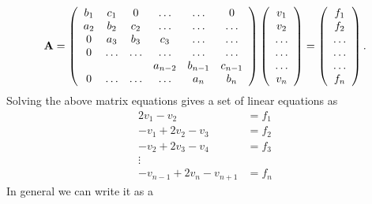 \begin{align}
	\mbox{\textbf{A}} = \left(\begin{array}{cccccc}
                           b_1& c_1 & 0 &\dots   & \dots & 0 \\
                           a_2 & b_2 & c_2 &\dots &\dots &\dots \\
                           0 & a_3 & b_3 & c_3 & \dots & \dots \\
                           0 & \dots   & \dots &\dots   &\dots & \dots \\
                           &   &  &a_{n-2}  &b_{n-1}& c_{n-1} \\
                           0 &  \dots  & \dots &  \dots &a_n & b_n \\
                      \end{array} \right)\left(\begin{array}{c}
                           v_1\\
                           v_2\\
                           \dots \\
                          \dots  \\
                          \dots \\
                           v_n\\
                      \end{array} \right)
  =\left(\begin{array}{c}
                           f_1\\
                           f_2\\
                           \dots \\
                           \dots \\
                          \dots \\
                           f_n\\
                      \end{array} \right).
	\label{eq:Nature5}
\end{align}
Solving the above matrix equations gives a set of linear equations as 
\begin{align*}
	2v_1 - v_2 &= f_1 \\
	-v_1 + 2v_2 -v_3 &= f_2 \\
	-v_2 + 2v_3 -v_4 &= f_3 \\
	\vdots \\
	-v_{n-1} + 2v_n -v_{n+1} &= f_n 
\end{align*}
In general we can write it as a 
